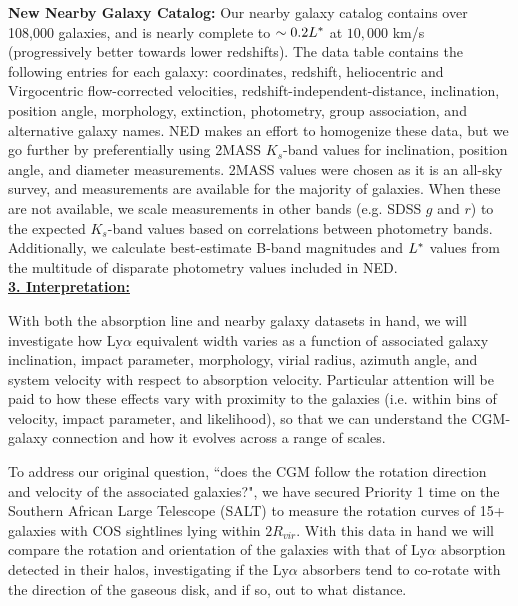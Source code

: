 \documentclass[12pt]{article}
\begin{document}
\textbf{New Nearby Galaxy Catalog:} Our nearby galaxy catalog contains over 108,000 galaxies, and is nearly complete to $\sim0.2 L^{\**}$ at $10,000$ km/s (progressively better towards lower redshifts). The data table contains the following entries for each galaxy: coordinates, redshift, heliocentric and Virgocentric flow-corrected velocities, redshift-independent-distance, inclination, position angle, morphology, extinction, photometry, group association, and alternative galaxy names. NED makes an effort to homogenize these data, but we go further by preferentially using 2MASS $K_s$-band values for inclination, position angle, and diameter measurements. 2MASS values were chosen as it is an all-sky survey, and measurements are available for the majority of galaxies. When these are not available, we scale measurements in other bands (e.g. SDSS $g$ and $r$) to the expected $K_s$-band values based on correlations between photometry bands. Additionally, we calculate best-estimate B-band magnitudes and $L^{\**}$ values from the multitude of disparate photometry values included in NED. \\


\noindent \textbf{\underline{3. Interpretation:}}

With both the absorption line and nearby galaxy datasets in hand, we will investigate how Ly$\alpha$ equivalent width varies as a function of associated galaxy inclination, impact parameter, morphology, virial radius, azimuth angle, and system velocity with respect to absorption velocity. Particular attention will be paid to how these effects vary with proximity to the galaxies (i.e. within bins of velocity,  impact parameter, and likelihood), so that we can understand the CGM-galaxy connection and how it evolves across a range of scales. 

To address our original question, ``does the CGM follow the rotation direction and velocity of the associated galaxies?", we have secured Priority 1 time on the Southern African Large Telescope (SALT) to measure the rotation curves of 15+ galaxies with COS sightlines lying within $2R_{vir}$. With this data in hand we will compare the rotation and orientation of the galaxies with that of Ly$\alpha$ absorption detected in their halos, investigating if the Ly$\alpha$ absorbers tend to co-rotate with the direction of the gaseous disk, and if so, out to what distance.
\end{document}
